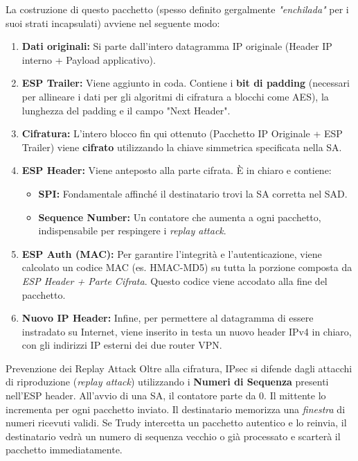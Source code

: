 \documentclass[a4paper,12pt]{report}
\begin{document}
La costruzione di questo pacchetto (spesso definito gergalmente \textit{"enchilada"} per i suoi strati incapsulati) avviene nel seguente modo:
\begin{enumerate}
    \item \textbf{Dati originali:} Si parte dall'intero datagramma IP originale (Header IP interno + Payload applicativo).
    \item \textbf{ESP Trailer:} Viene aggiunto in coda. Contiene i \textbf{bit di padding} (necessari per allineare i dati per gli algoritmi di cifratura a blocchi come AES), la lunghezza del padding e il campo "Next Header".
    \item \textbf{Cifratura:} L'intero blocco fin qui ottenuto (Pacchetto IP Originale + ESP Trailer) viene \textbf{cifrato} utilizzando la chiave simmetrica specificata nella SA.
    \item \textbf{ESP Header:} Viene anteposto alla parte cifrata. È in chiaro e contiene:
    \begin{itemize}
        \item \textbf{SPI:} Fondamentale affinché il destinatario trovi la SA corretta nel SAD.
        \item \textbf{Sequence Number:} Un contatore che aumenta a ogni pacchetto, indispensabile per respingere i \textit{replay attack}.
    \end{itemize}
    \item \textbf{ESP Auth (MAC):} Per garantire l'integrità e l'autenticazione, viene calcolato un codice MAC (es. HMAC-MD5) su tutta la porzione composta da \textit{ESP Header + Parte Cifrata}. Questo codice viene accodato alla fine del pacchetto.
    \item \textbf{Nuovo IP Header:} Infine, per permettere al datagramma di essere instradato su Internet, viene inserito in testa un nuovo header IPv4 in chiaro, con gli indirizzi IP esterni dei due router VPN.
\end{enumerate}


\begin{urgentbox}{Prevenzione dei Replay Attack}
Oltre alla cifratura, IPsec si difende dagli attacchi di riproduzione (\textit{replay attack}) utilizzando i \textbf{Numeri di Sequenza} presenti nell'ESP header. 
All'avvio di una SA, il contatore parte da 0. Il mittente lo incrementa per ogni pacchetto inviato. Il destinatario memorizza una \textit{finestra} di numeri ricevuti validi. Se Trudy intercetta un pacchetto autentico e lo reinvia, il destinatario vedrà un numero di sequenza vecchio o già processato e scarterà il pacchetto immediatamente.
\end{urgentbox}
\end{document}
